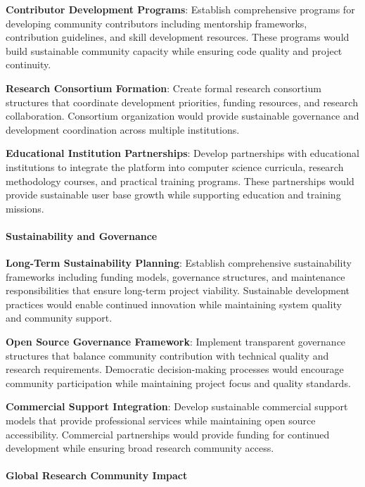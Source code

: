 \documentclass[12pt,a4paper]{article}
\begin{document}
\textbf{Contributor Development Programs}: Establish comprehensive programs for developing community contributors including
mentorship frameworks, contribution guidelines, and skill development resources. These programs would build sustainable
community capacity while ensuring code quality and project continuity.

\textbf{Research Consortium Formation}: Create formal research consortium structures that coordinate development priorities,
funding resources, and research collaboration. Consortium organization would provide sustainable governance and
development coordination across multiple institutions.

\textbf{Educational Institution Partnerships}: Develop partnerships with educational institutions to integrate the platform
into computer science curricula, research methodology courses, and practical training programs. These partnerships would
provide sustainable user base growth while supporting education and training missions.

\paragraph{Sustainability and Governance}

\textbf{Long-Term Sustainability Planning}: Establish comprehensive sustainability frameworks including funding models,
governance structures, and maintenance responsibilities that ensure long-term project viability. Sustainable development
practices would enable continued innovation while maintaining system quality and community support.

\textbf{Open Source Governance Framework}: Implement transparent governance structures that balance community contribution
with technical quality and research requirements. Democratic decision-making processes would encourage community
participation while maintaining project focus and quality standards.

\textbf{Commercial Support Integration}: Develop sustainable commercial support models that provide professional services
while maintaining open source accessibility. Commercial partnerships would provide funding for continued development
while ensuring broad research community access.

\paragraph{Global Research Community Impact}
\end{document}
